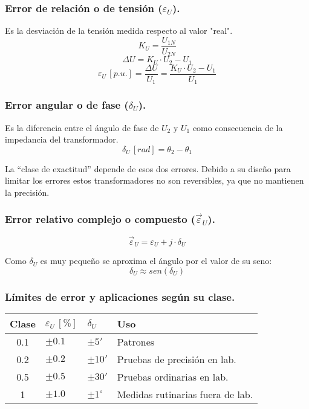 				
				\subsubsection*{Error de relación o de tensión ($\varepsilon_U$).}
					Es la desviación de la tensión medida respecto al valor "real".
					\[K_U=\dfrac{U_{1N}}{U_{2N}}\]
					\[\Delta U = K_U\cdot U_2 - U_1\]
					\[\varepsilon_U\,[p.u.] = \dfrac{\Delta U}{U_1} = \dfrac{K_U\cdot U_2 - U_1}{U_1}\]
					
				\subsubsection*{Error angular o de fase ($\delta_U$).}
					Es la diferencia entre el ángulo de fase de $U_2$ y $U_1$ como consecuencia de la impedancia del transformador.
					\[\delta_U\,[rad] = \theta_2 - \theta_1\]
					
				
				La “clase de exactitud” depende de esos dos errores. Debido
				a su diseño para limitar los errores estos transformadores no
				son reversibles, ya que no mantienen la precisión.
				
				
				\subsubsection*{Error relativo complejo o compuesto ($\vec{\varepsilon}_U$).}
					\[\vec{\varepsilon}_U = \varepsilon_U + j\cdot \delta_U\]
					
					
					Como $\delta_U$ es muy pequeño se aproxima el ángulo por el
					valor de su seno:
					\[\delta_U \approx sen(\delta_U)\]
					
				
				\subsubsection*{Límites de error y aplicaciones según su clase.}
				\begin{table}[H]
					\begin{center}
						\begin{tabular}{clll}
							Clase & $\varepsilon_U\,[\%]$ & $\delta_U$ & Uso\\
							\hline
							0.1 & $\pm 0.1$ & $\pm 5'$ & Patrones\\
							0.2 & $\pm 0.2$ & $\pm 10'$ & Pruebas de precisión en lab.\\
							0.5 & $\pm 0.5$ & $\pm 30'$ & Pruebas ordinarias en lab.\\
							1   & $\pm 1.0$ & $\pm 1^\circ$ & Medidas rutinarias fuera de lab.\\
						\end{tabular}
					\end{center}
				\end{table}
					
